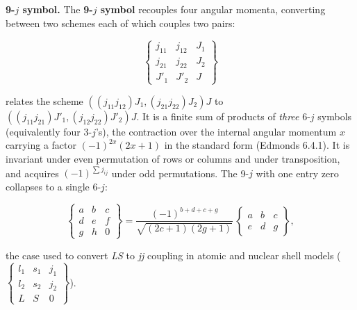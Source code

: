 \medskip\noindent\textbf{9-$j$ symbol.} The \textbf{9-$j$ symbol} recouples four angular momenta, converting between two schemes each of which couples two pairs:
\begin{linenomath}
\begin{equation}
\begin{Bmatrix}j_{11}&j_{12}&J_{1}\\ j_{21}&j_{22}&J_{2}\\ J'_{1}&J'_{2}&J\end{Bmatrix}
\label{eq:9j}
\end{equation}
\end{linenomath}
relates the scheme $((j_{11}j_{12})J_{1},(j_{21}j_{22})J_{2})J$ to $((j_{11}j_{21})J'_{1},(j_{12}j_{22})J'_{2})J$. It is a finite sum of products of \emph{three} 6-$j$ symbols (equivalently four 3-$j$'s), the contraction over the internal angular momentum $x$ carrying a factor $(-1)^{2x}(2x+1)$ in the standard form (Edmonds 6.4.1). It is invariant under even permutation of rows or columns and under transposition, and acquires $(-1)^{\sum j_{ij}}$ under odd permutations. The 9-$j$ with one entry zero collapses to a single 6-$j$:
\begin{linenomath}
\begin{equation}
\begin{Bmatrix}a&b&c\\ d&e&f\\ g&h&0\end{Bmatrix}
=\frac{(-1)^{b+d+c+g}}{\sqrt{(2c+1)(2g+1)}}\,
\begin{Bmatrix}a&b&c\\ e&d&g\end{Bmatrix},
\label{eq:9j-zero}
\end{equation}
\end{linenomath}
the case used to convert \emph{LS} to \emph{jj} coupling in atomic and nuclear shell models ($\begin{Bmatrix}l_{1}&s_{1}&j_{1}\\ l_{2}&s_{2}&j_{2}\\ L&S&0\end{Bmatrix}$).


